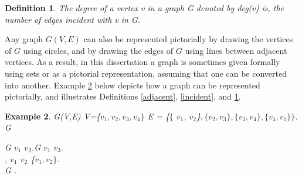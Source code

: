 \documentclass[12pt]{article}
\newtheorem{definition}{Definition}[subsection]
\newtheorem{example}[definition]{Example}
\numberwithin{equation}{subsection}
\numberwithin{table}{subsection}
\numberwithin{algorithm}{subsection}
\numberwithin{figure}{subsection}
\begin{document}
\begin{definition}
\label{degree}
The degree of a vertex v in a graph G denoted by deg(v) is, the number of edges incident with v in G. {}
\end{definition}
Any graph $\mathit{G(V,E)}$ can also be represented pictorially by drawing the vertices of $\mathit{G}$ using circles, and by drawing the edges of $\mathit{G}$ using lines between adjacent vertices. As a result, in this dissertation a graph is sometimes given formally using sets or as a pictorial representation, assuming that one can be converted into another. Example \ref{Example 1} below depicts how a graph can be represented pictorially, and illustrates Definitions  \ref{adjacent}, \ref{incident}, and \ref{degree}.
\begin{example}
\label{Example 1}
{} G(V,E) {}  V=\{$v_1, v_2, v_3, v_4\}$ {} E = \{$\{$ $v_1$, $v_2$\}$, \{v_2,v_3\}, \{v_3,v_4\}, \{v_4,v_1\}\}$.\\{} G {}\\
\begin{center}
\end{center}
{}G {} $v_1$ {} $v_2$.{}G {} $v_1$ {} $v_3.$\\ {}, $v_1$ {} $v_2$ {} \{$v_1, v_2\}$.\\
{} G {}.
\end{example}
\end{document}
